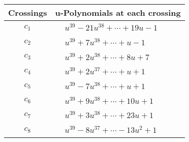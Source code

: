 \documentclass[1p]{elsarticle_modified}
\theoremstyle{definition}
\begin{document}
\begin{tabular}{m{50pt}|m{274pt}}
Crossings & \hspace{64pt}u-Polynomials at each crossing \\
\hline $$\begin{aligned}c_{1}\end{aligned}$$&$\begin{aligned}
&u^{39}-21 u^{38}+\cdots+19 u-1
\end{aligned}$\\
\hline $$\begin{aligned}c_{2}\end{aligned}$$&$\begin{aligned}
&u^{39}+7 u^{38}+\cdots+u-1
\end{aligned}$\\
\hline $$\begin{aligned}c_{3}\end{aligned}$$&$\begin{aligned}
&u^{39}+2 u^{38}+\cdots+8 u+7
\end{aligned}$\\
\hline $$\begin{aligned}c_{4}\end{aligned}$$&$\begin{aligned}
&u^{39}+2 u^{37}+\cdots+u+1
\end{aligned}$\\
\hline $$\begin{aligned}c_{5}\end{aligned}$$&$\begin{aligned}
&u^{39}-7 u^{38}+\cdots+u+1
\end{aligned}$\\
\hline $$\begin{aligned}c_{6}\end{aligned}$$&$\begin{aligned}
&u^{39}+9 u^{38}+\cdots+10 u+1
\end{aligned}$\\
\hline $$\begin{aligned}c_{7}\end{aligned}$$&$\begin{aligned}
&u^{39}+3 u^{38}+\cdots+23 u+1
\end{aligned}$\\
\hline $$\begin{aligned}c_{8}\end{aligned}$$&$\begin{aligned}
&u^{39}-8 u^{37}+\cdots-13 u^2+1
\end{aligned}$\\

\end{tabular}
\end{document}
